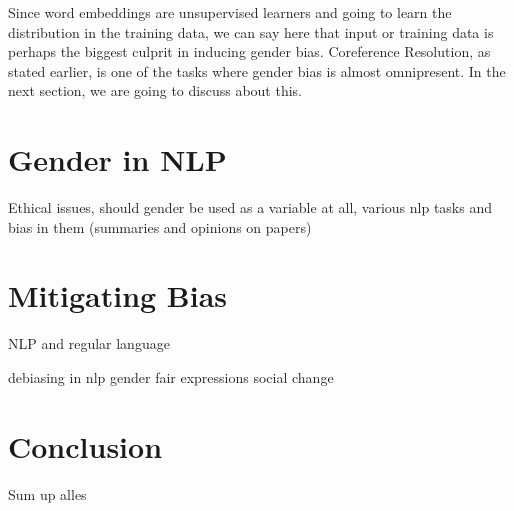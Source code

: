 \documentclass{article}
\begin{document}
\noindent
Since word embeddings are unsupervised learners and going to learn the distribution in the training data, we can say here that input or training data is perhaps the biggest culprit in inducing gender bias. Coreference Resolution, as stated earlier, is one of the tasks where gender bias is almost omnipresent. In the next section, we are going to discuss about this. 





\section{Gender in NLP}
Ethical issues, should gender be used as a variable at all, various nlp tasks and bias in them (summaries and opinions on papers)

\section{Mitigating Bias}
NLP and regular language

debiasing in nlp
gender fair expressions
social change

\section{Conclusion}
Sum up alles

\clearpage


\end{document}
